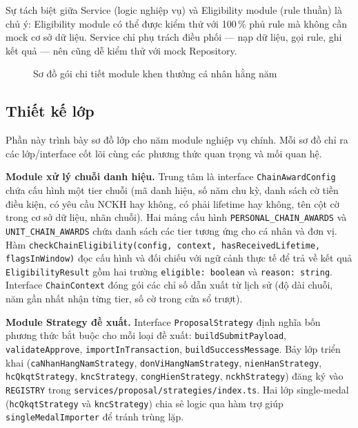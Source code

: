 \documentclass[../DoAn.tex]{subfiles}
\begin{document}
Sự tách biệt giữa Service (logic nghiệp vụ) và Eligibility module (rule thuần) là chủ ý: Eligibility module có thể được kiểm thử với 100\,\% phủ rule mà không cần mock cơ sở dữ liệu. Service chỉ phụ trách điều phối --- nạp dữ liệu, gọi rule, ghi kết quả --- nên cũng dễ kiểm thử với mock Repository.

\begin{figure}[H]
    \centering
    \caption{Sơ đồ gói chi tiết module khen thưởng cá nhân hằng năm}
    \label{fig:goi-canhan-hangnam}
\end{figure}

\subsection{Thiết kế lớp}
\label{subsection:4.1.5}

Phần này trình bày sơ đồ lớp cho năm module nghiệp vụ chính. Mỗi sơ đồ chỉ ra các lớp/interface cốt lõi cùng các phương thức quan trọng và mối quan hệ.

\textbf{Module xử lý chuỗi danh hiệu.} Trung tâm là interface \texttt{ChainAwardConfig} chứa cấu hình một tier chuỗi (mã danh hiệu, số năm chu kỳ, danh sách cờ tiền điều kiện, có yêu cầu NCKH hay không, có phải lifetime hay không, tên cột cờ trong cơ sở dữ liệu, nhãn chuỗi). Hai mảng cấu hình \texttt{PERSONAL\_CHAIN\_AWARDS} và \texttt{UNIT\_CHAIN\_AWARDS} chứa danh sách các tier tương ứng cho cá nhân và đơn vị. Hàm \texttt{checkChainEligibility(config, context, hasReceivedLifetime, flagsInWindow)} đọc cấu hình và đối chiếu với ngữ cảnh thực tế để trả về kết quả \texttt{EligibilityResult} gồm hai trường \texttt{eligible: boolean} và \texttt{reason: string}. Interface \texttt{ChainContext} đóng gói các chỉ số dẫn xuất từ lịch sử (độ dài chuỗi, năm gần nhất nhận từng tier, số cờ trong cửa sổ trượt).

\textbf{Module Strategy đề xuất.} Interface \texttt{ProposalStrategy} định nghĩa bốn phương thức bắt buộc cho mỗi loại đề xuất: \texttt{buildSubmitPayload}, \texttt{validateApprove}, \texttt{importInTransaction}, \texttt{buildSuccessMessage}. Bảy lớp triển khai (\texttt{caNhanHangNamStrategy}, \texttt{donViHangNamStrategy}, \texttt{nienHanStrategy}, \texttt{hcQkqtStrategy}, \texttt{kncStrategy}, \texttt{congHienStrategy}, \texttt{nckhStrategy}) đăng ký vào \texttt{REGISTRY} trong \texttt{services/proposal/strategies/index.ts}. Hai lớp single-medal (\texttt{hcQkqtStrategy} và \texttt{kncStrategy}) chia sẻ logic qua hàm trợ giúp \texttt{singleMedalImporter} để tránh trùng lặp.
\end{document}
